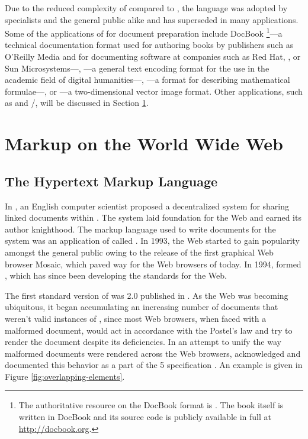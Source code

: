 \documentclass[
  a5paper,10pt,           %
  dvipsnames              %
]{book}
\begin{document}
Due to the reduced complexity of  compared to , the
language was adopted by specialists and the general public alike and has
superseded  in many applications. Some of the applications of
 for document preparation include DocBook%
\footnote{
  The authoritative resource on the DocBook  format is
  . The book itself is written in DocBook and its source code
  is publicly available in full at \url{http://docbook.org}.
}---a technical documentation format used for authoring books by publishers such
as O'Reilly Media and for documenting software at companies such as Red Hat,
, or Sun Microsystems---, ---a general text encoding
format for the use in the academic field of digital humanities---,
---a format for describing mathematical formulae---, or
---a two-dimensional vector image format. Other 
applications, such as  and /, will
be discussed in Section \ref{sec:www-markup}.
      
\section{Markup on the World Wide Web}\label{sec:www-markup}
\subsection{The Hypertext Markup Language}
In \citeyear{bernerslee89}, an English computer scientist  proposed a decentralized system for sharing linked documents within
 \cite{bernerslee89}. The system laid foundation for the Web
and earned its author knighthood.  The markup language used to write documents
for the system was an application of  called . In
1993, the Web started to gain popularity amongst the general public owing to the
release of the first graphical Web browser Mosaic, which paved way for the Web
browsers of today. In 1994,  formed
, which has since been developing the standards for the Web.

The first standard version of  was  2.0
\cite{bernerslee95} published in \citeyear{bernerslee95}. As the Web was
becoming ubiquitous, it began accumulating an increasing number of documents
that weren't valid instances of , since most Web browsers, when
faced with a malformed document, would act in accordance with the Postel's law
and try to render the document despite its deficiencies. In an attempt to unify
the way malformed  documents were rendered across the Web
browsers,  acknowledged and documented this behavior as a part of
the 5 specification \cite[sec.\,8.2]{hickson14}. An example is
given in Figure \ref{fig:overlapping-elements}.
\end{document}
